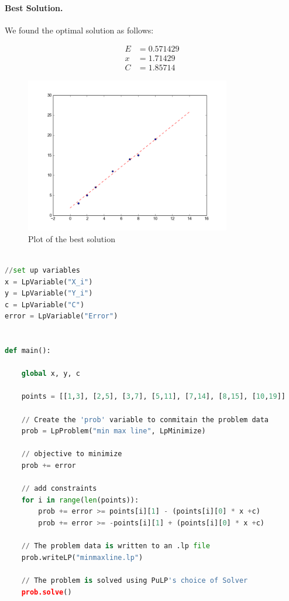 \documentclass[11pt,letterpaper]{article}
\begin{document}
\paragraph{Best Solution.} \bigskip We found the optimal solution as follows:

\begin{align*}
 E &= 0.571429 \\
 x &= 1.71429 \\
 C &= 1.85714 
\end{align*}

\begin{figure}[h!]
\centering
\includegraphics[width=0.8\textwidth]{figure_1}
\caption{Plot of the best solution}
\end{figure} 


\begin{lstlisting}[language=python,caption={Code to solve linear program},mathescape]

//set up variables
x = LpVariable("X_i")
y = LpVariable("Y_i")
c = LpVariable("C")
error = LpVariable("Error")


def main():

	global x, y, c

	points = [[1,3], [2,5], [3,7], [5,11], [7,14], [8,15], [10,19]]

	// Create the 'prob' variable to conmitain the problem data
	prob = LpProblem("min max line", LpMinimize)

	// objective to minimize
	prob += error

	// add constraints
	for i in range(len(points)):
		prob += error >= points[i][1] - (points[i][0] * x +c)
		prob += error >= -points[i][1] + (points[i][0] * x +c)
	
	// The problem data is written to an .lp file
	prob.writeLP("minmaxline.lp")

	// The problem is solved using PuLP's choice of Solver
	prob.solve()
	

\end{lstlisting}
\end{document}
